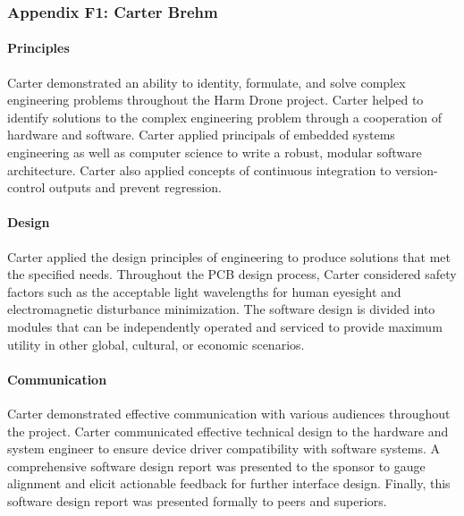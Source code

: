 \documentclass[../../main.tex]{subfiles}
\begin{document}
\subsubsection{Appendix F1: Carter Brehm}

\paragraph{Principles} Carter demonstrated an ability to identity, formulate, and solve complex engineering problems throughout the Harm Drone project. Carter helped to identify solutions to the complex engineering problem through a cooperation of hardware and software. Carter applied principals of embedded systems engineering as well as computer science to write a robust, modular software architecture. Carter also applied concepts of continuous integration to version-control outputs and prevent regression.


\paragraph{Design} Carter applied the design principles of engineering to produce solutions that met the specified needs. Throughout the PCB design process, Carter considered safety factors such as the acceptable light wavelengths for human eyesight and electromagnetic disturbance minimization. The software design is divided into modules that can be independently operated and serviced to provide maximum utility in other global, cultural, or economic scenarios.


\paragraph{Communication} Carter demonstrated effective communication with various audiences throughout the project. Carter communicated effective technical design to the hardware and system engineer to ensure device driver compatibility with software systems. A comprehensive software design report was presented to the sponsor to gauge alignment and elicit actionable feedback for further interface design. Finally, this software design report was presented formally to peers and superiors.
\end{document}
